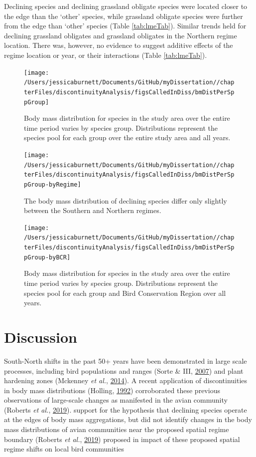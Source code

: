 \documentclass[12pt,twoside,openany]{reedthesis}
\begin{document}
Declining species and declining grassland obligate species were located closer to the edge than the `other' species, while grassland obligate species were further from the edge than `other' species (Table \ref{tab:lmeTab}). Similar trends held for declining grassland obligates and grassland obligates in the Northern regime location. There was, however, no evidence to suggest additive effects of the regime location or year, or their interactions (Table \ref{tab:lmeTab}).
\begin{figure}
\texttt{[image: /Users/jessicaburnett/Documents/GitHub/myDissertation//chapterFiles/discontinuityAnalysis/figsCalledInDiss/bmDistPerSppGroup]} \caption{Body mass distribution for species in the study area over the entire time period varies by species group. Distributions represent the species pool for each group over the entire study area and all years.}\label{fig:bmDistPerSppGroup}
\end{figure}
\begin{figure}
\texttt{[image: /Users/jessicaburnett/Documents/GitHub/myDissertation//chapterFiles/discontinuityAnalysis/figsCalledInDiss/bmDistPerSppGroup-byRegime]} \caption{The body mass distribution of declining species differ only slightly between the Southern and Northern regimes.}\label{fig:bmDistPerSppGroup-byRegime}
\end{figure}
\begin{figure}
\texttt{[image: /Users/jessicaburnett/Documents/GitHub/myDissertation//chapterFiles/discontinuityAnalysis/figsCalledInDiss/bmDistPerSppGroup-byBCR]} \caption{Body mass distribution for species in the study area over the entire time period varies by species group. Distributions represent the species pool for each group and Bird Conservation Region over all years.}\label{fig:bmDistPerSppGroup-byBCR}
\end{figure}
\hypertarget{discussion-4}{%
\section{Discussion}\label{discussion-4}}

South-North shifts in the past 50+ years have been demonstrated in large scale processes, including bird populations and ranges (Sorte \& III, \protect\hyperlink{ref-sorte2007poleward}{2007}) and plant hardening zones (Mckenney \emph{et al.}, \protect\hyperlink{ref-mckenney2014change}{2014}). A recent application of discontinuities in body mass distributions (Holling, \protect\hyperlink{ref-holling1992cross}{1992}) corroborated these previous observations of large-scale changes as manifested in the avian community (Roberts \emph{et al.}, \protect\hyperlink{ref-roberts2019shifting}{2019}). support for the hypothesis that declining species operate at the edges of body mass aggregations, but did not identify changes in the body mass distributions of avian communities near the proposed spatial regime boundary (Roberts \emph{et al.}, \protect\hyperlink{ref-roberts2019shifting}{2019}) proposed in impact of these proposed spatial regime shifts on local bird communities
\end{document}
